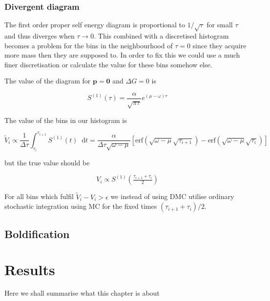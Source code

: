 \documentclass[12pt]{report}
\renewcommand{\vec}[1]{\boldsymbol{\mathbf{#1}}}                        %
\newcommand*\diff{\mathop{}\!\mathrm{d}}
\newcommand{\todo}[1]{{\leavevmode\color{todo}#1}}
\begin{document}
\subsection{Divergent diagram}

The first order proper self energy diagram is proportional to $ 1/\sqrt{\tau} $ for small $ \tau $ and thus diverges when $ \tau \rightarrow 0 $. This combined with a discretised histogram becomes a problem for the bins in the neighbourhood of $ \tau = 0 $ since they acquire more mass then they are supposed to. In order to fix this we could use a much finer discretisation or calculate the value for these bins somehow else.

The value of the diagram for $ \vec p = \vec 0 $ and $ \Delta G = 0 $ is

\begin{equation}
	S^{(1)}(\tau) = \frac{\alpha}{\sqrt{\pi \tau}} e^{(\mu - \omega)\tau}
\end{equation}

The value of the bins in our histogram is

\begin{equation}
	\tilde V_i \propto \frac{1}{\Delta \tau} \int_{\tau_i}^{\tau_{i + 1}} S^{(1)} (t) \diff t
	= \frac{\alpha}{\Delta \tau \sqrt{\omega - \mu}} \left[ \text{erf}\left(\sqrt{\omega - \mu} \sqrt{\tau_{i+1}}\right) - \text{erf}\left(\sqrt{\omega - \mu} \sqrt{\tau_i}\right) \right]
\end{equation}

 but the true value should be
 
\begin{equation}
	V_i \propto S^{(1)} \left( \tfrac{\tau_{i+1} + \tau_i}{2} \right)	
\end{equation}

For all bins which fulfil $ \tilde V_i  - V_i > \epsilon $ we instead of using DMC utilise ordinary stochastic integration using MC for the fixed times $ (\tau_{i+1} + \tau_i)/2 $.

\section{Boldification}




\chapter{Results}
\todo{Here we shall summarise what this chapter is about}
\end{document}

